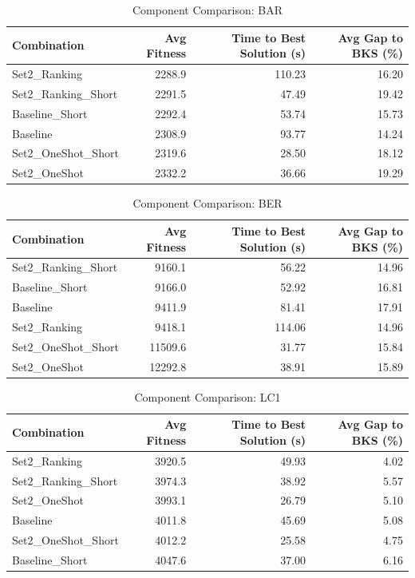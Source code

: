 \documentclass{article}
\begin{document}
\begin{table}[htbp]
\centering
\caption{Component Comparison: BAR}
\label{tab:comparison_bar}
\begin{tabular}{lrrr}
\toprule
Combination & Avg Fitness & Time to Best Solution (s) & Avg Gap to BKS (\%) \\
\midrule
Set2\_Ranking & 2288.9 & 110.23 & 16.20 \\
Set2\_Ranking\_Short & 2291.5 & 47.49 & 19.42 \\
Baseline\_Short & 2292.4 & 53.74 & 15.73 \\
Baseline & 2308.9 & 93.77 & 14.24 \\
Set2\_OneShot\_Short & 2319.6 & 28.50 & 18.12 \\
Set2\_OneShot & 2332.2 & 36.66 & 19.29 \\
\bottomrule
\end{tabular}
\end{table}

\begin{table}[htbp]
\centering
\caption{Component Comparison: BER}
\label{tab:comparison_ber}
\begin{tabular}{lrrr}
\toprule
Combination & Avg Fitness & Time to Best Solution (s) & Avg Gap to BKS (\%) \\
\midrule
Set2\_Ranking\_Short & 9160.1 & 56.22 & 14.96 \\
Baseline\_Short & 9166.0 & 52.92 & 16.81 \\
Baseline & 9411.9 & 81.41 & 17.91 \\
Set2\_Ranking & 9418.1 & 114.06 & 14.96 \\
Set2\_OneShot\_Short & 11509.6 & 31.77 & 15.84 \\
Set2\_OneShot & 12292.8 & 38.91 & 15.89 \\
\bottomrule
\end{tabular}
\end{table}

\begin{table}[htbp]
\centering
\caption{Component Comparison: LC1}
\label{tab:comparison_lc1}
\begin{tabular}{lrrr}
\toprule
Combination & Avg Fitness & Time to Best Solution (s) & Avg Gap to BKS (\%) \\
\midrule
Set2\_Ranking & 3920.5 & 49.93 & 4.02 \\
Set2\_Ranking\_Short & 3974.3 & 38.92 & 5.57 \\
Set2\_OneShot & 3993.1 & 26.79 & 5.10 \\
Baseline & 4011.8 & 45.69 & 5.08 \\
Set2\_OneShot\_Short & 4012.2 & 25.58 & 4.75 \\
Baseline\_Short & 4047.6 & 37.00 & 6.16 \\
\bottomrule
\end{tabular}
\end{table}
\end{document}
